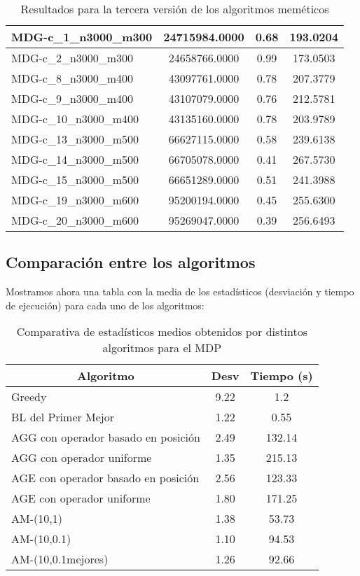 \documentclass[10pt,a4paper]{article}
\begin{document}
\begin{table}[H]
\begin{center}
\begin{tabular}{|l|c|c|c|}
					MDG-c\_1\_n3000\_m300 & 24715984.0000 & 0.68 & 193.0204 \\ \hline
					MDG-c\_2\_n3000\_m300 & 24658766.0000 & 0.99 & 173.0503 \\ \hline
					MDG-c\_8\_n3000\_m400 & 43097761.0000 & 0.78 & 207.3779 \\ \hline
					MDG-c\_9\_n3000\_m400 & 43107079.0000 & 0.76 & 212.5781 \\ \hline
					MDG-c\_10\_n3000\_m400 & 43135160.0000 & 0.78 & 203.9789 \\ \hline
					MDG-c\_13\_n3000\_m500 & 66627115.0000 & 0.58 & 239.6138 \\ \hline
					MDG-c\_14\_n3000\_m500 & 66705078.0000 & 0.41 & 267.5730 \\ \hline
					MDG-c\_15\_n3000\_m500 & 66651289.0000 & 0.51 & 241.3988 \\ \hline
					MDG-c\_19\_n3000\_m600 & 95200194.0000 & 0.45 & 255.6300 \\ \hline
					MDG-c\_20\_n3000\_m600 & 95269047.0000 & 0.39 & 256.6493 \\ \hline
				\end{tabular}
				\caption{Resultados para la tercera versión de los algoritmos meméticos}
				\label{}
				\end{center}
			\end{table}
			
			\newpage
			
\subsection{Comparación entre los algoritmos}
Mostramos ahora una tabla con la media de los estadísticos (desviación  y tiempo de ejecución) para cada uno de los algoritmos:
\begin{table}[H]
	\begin{center}
		\begin{tabular}{|l|c|c|}
			\hline
			\multicolumn{1}{|c|}{\textbf{Algoritmo}} & \textbf{Desv} & \textbf{Tiempo (s)} \\ \hline
			Greedy & 9.22 & 1.2 \\ \hline
			BL del Primer Mejor & 1.22 & 0.55 \\ \hline
			AGG con operador basado en posición & 2.49 & 132.14 \\ \hline
			AGG con operador uniforme & 1.35 & 215.13 \\ \hline
			AGE con operador basado en posición & 2.56 & 123.33 \\ \hline
			AGE con operador uniforme & 1.80 & 171.25 \\ \hline
			AM-(10,1) & 1.38 & 53.73 \\ \hline
			AM-(10,0.1) & 1.10 & 94.53 \\ \hline
			AM-(10,0.1mejores) & 1.26 & 92.66 \\ \hline
		\end{tabular}
	\end{center}
	\caption{Comparativa de estadísticos medios obtenidos por distintos algoritmos para el MDP}
	\label{}
\end{table}
\end{document}
